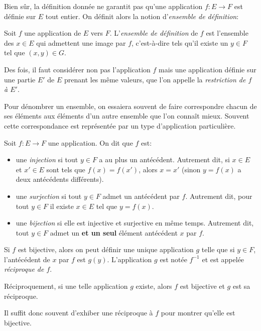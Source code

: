 \documentclass[11pt]{article}
\theoremstyle{definition}
\theoremstyle{remark}
\theoremstyle{theorem}
\begin{document}
Bien sûr, la définition donnée ne garantit pas qu'une application $f:E\longrightarrow F$ est définie sur $E$ tout entier. On définit alors la notion d'\textit{ensemble de définition}:

\begin{defn}
	Soit $f$ une application de $E$ vers $F$. L'\textit{ensemble de définition} de $f$ est l'ensemble des $x\in E$ qui admettent une image par $f$, c'est-à-dire tels qu'il existe un $y\in F$ tel que $(x,y)\in G$.
\end{defn}

Des fois, il faut considérer non pas l'application $f$ mais une application définie sur une partie $E'$ de $E$ prenant les même valeurs, que l'on appelle la \textit{restriction de $f$ à $E'$}.

Pour dénombrer un ensemble, on essaiera souvent de faire correspondre chacun de ses éléments aux éléments d'un autre ensemble que l'on connaît mieux. Souvent cette correspondance est représentée par un type d'application particulière.
\begin{defn}
	Soit $f:E\longrightarrow F$ une application. On dit que $f$ est:
	\begin{itemize}
	\item une \textit{injection} si tout $y\in F$ a au plus un antécédent. Autrement dit, si $x\in E$ et $x'\in E$ sont tels que $f(x)=f(x')$, alors $x=x'$ (sinon $y=f(x)$ a deux antécédents différents).
	\item une \textit{surjection} si tout $y\in F$ admet un antécédent par $f$. Autrement dit, pour tout $y\in F$ il existe $x\in E$ tel que $y=f(x)$.
	\item une \textit{bijection} si elle est injective et surjective en même temps. Autrement dit, tout $y\in F$ admet un \textbf{et un seul} élément antécédent $x$ par $f$.
	\end{itemize}
	
	Si $f$ est bijective, alors on peut définir une unique application $g$ telle que si $y\in F$, l'antécédent de $x$ par $f$ est $g(y)$. L'application $g$ est notée $f^{-1}$ et est appelée \textit{réciproque de $f$}.
	
	Réciproquement, si une telle application $g$ existe, alors $f$ est bijective et $g$ est sa réciproque.
\end{defn}

Il suffit donc souvent d'exhiber une réciproque à $f$ pour montrer qu'elle est bijective.
\end{document}
